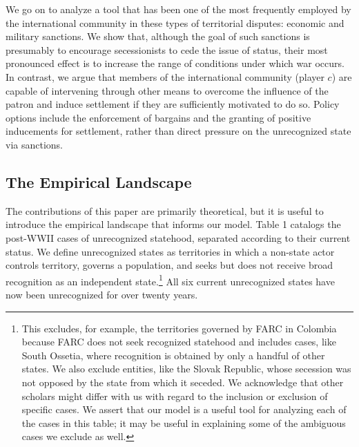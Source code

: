 \documentclass[11pt,letterpaper, notitlepage]{article}
\begin{document}
We go on to analyze a tool that has been one of the most frequently employed by the international community in these types of territorial disputes: economic and military sanctions. We show that, although the goal of such sanctions is presumably to encourage secessionists to cede the issue of status, their most pronounced effect is to increase the range of conditions under which war occurs. %
In contrast, we argue that members of the international community (player $c$) are capable of intervening through other means to overcome the influence of the patron and induce settlement if they are sufficiently motivated to do so. Policy options include the enforcement of bargains and the granting of positive inducements for settlement, rather than direct pressure on the unrecognized state via sanctions.

\subsection{The Empirical Landscape}

The contributions of this paper are primarily theoretical, but it is useful to introduce the empirical landscape that informs our model. %
Table 1 catalogs the post-WWII cases of unrecognized statehood, separated according to their current status. We define unrecognized states as territories in which a non-state actor controls territory, governs a population, and seeks but does not receive broad recognition as an independent state.\footnote{This excludes, for example, the territories governed by FARC in Colombia because FARC does not seek recognized statehood and includes cases, like South Ossetia, where recognition is obtained by only a handful of other states. We also exclude entities, like the Slovak Republic, whose secession was not opposed by the state from which it seceded. We acknowledge that other scholars might differ with us with regard to the inclusion or exclusion of specific cases. We assert that our model is a useful tool for analyzing each of the cases in this table; it may be useful in explaining some of the ambiguous cases we exclude as well.} All six current unrecognized states have now been unrecognized for over twenty years.
\end{document}
